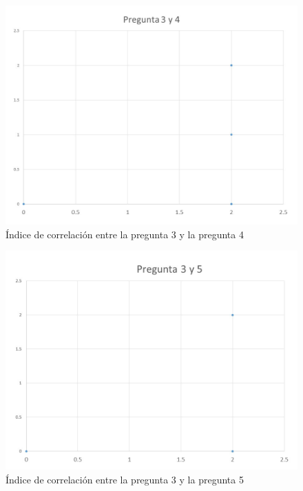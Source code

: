 \documentclass[12pt] {report}
\begin{document}
\begin{figure}[H]
\centering 
\includegraphics[scale=.7]{MCorrelacionmin34.JPG}
\caption{Índice de correlación entre la pregunta 3 y la pregunta 4}
\end{figure}

\begin{figure}[H]
\centering 
\includegraphics[scale=.7]{MCorrelacionmin35.JPG}
\caption{Índice de correlación entre la pregunta 3 y la pregunta 5}
\end{figure}
\end{document}
